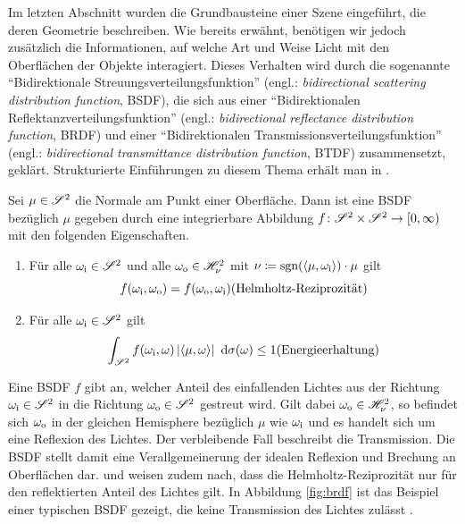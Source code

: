		Im letzten Abschnitt wurden die Grundbausteine einer Szene eingeführt, die deren Geometrie beschreiben.
		Wie bereits erwähnt, benötigen wir jedoch zusätzlich die Informationen, auf welche Art und Weise Licht mit den Oberflächen der Objekte interagiert.
		Dieses Verhalten wird durch die sogenannte \enquote{Bidirektionale Streuungsverteilungsfunktion} (engl.: \textit{bidirectional scattering distribution function}, BSDF), die sich aus einer \enquote{Bidirektionalen Reflektanzverteilungsfunktion} (engl.: \textit{bidirectional reflectance distribution function}, BRDF) und einer \enquote{Bidirektionalen Transmissionsverteilungsfunktion} (engl.: \textit{bidirectional transmittance distribution function}, BTDF) zusammensetzt, geklärt.
		Strukturierte Einführungen zu diesem Thema erhält man in \cite{pbrt3,veach-thesis,real-time-render,intro-brdf,radiosity}.
		\begin{definition}
			Sei $\mu\in\mathscr{S}^{2}$ die Normale am Punkt einer Oberfläche.
			Dann ist eine BSDF bezüglich $\mu$ gegeben durch eine integrierbare Abbildung $f\colon\mathscr{S}^{2}\times\mathscr{S}^{2}\to[0,\infty)$ mit den folgenden Eigenschaften.

			\begin{enumerate}[label = \normalfont{(\roman*)}]
				\item
				Für alle $\omega_{\mathrm{i}}\in\mathscr{S}^{2}$ und alle $\omega_{\mathrm{o}}\in\mathscr{H}^{2}_{\nu}$ mit $\nu\coloneqq\operatorname{sgn}(\left\langle \mu,\omega_{\mathrm{i}} \right\rangle)\cdot\mu$ gilt
				\[
					f(\omega_\m{i},\omega_\m{o}) = f(\omega_\m{o},\omega_\m{i}) \hfill \text{(Helmholtz-Reziprozität)}
				\]

				\item
				Für alle $\omega_{\mathrm{i}}\in\mathscr{S}^{2}$ gilt
				\[
					\integral{\ssp}{}{f(\omega_\m{i},\omega) \abs{\dotp{\mu}{\omega}}}{\sigma(\omega)} \leq 1 \hfill \text{(Energieerhaltung)}
				\]
			\end{enumerate}
		\end{definition}

		Eine BSDF $f$ gibt an, welcher Anteil des einfallenden Lichtes aus der Richtung $\omega_{\mathrm{i}}\in\mathscr{S}^{2}$ in die Richtung $\omega_{\mathrm{o}}\in\mathscr{S}^{2}$ gestreut wird.
		Gilt dabei $\omega_{\mathrm{o}}\in\mathscr{H}^{2}_{\nu}$, so befindet sich $\omega_{\mathrm{o}}$ in der gleichen Hemisphere bezüglich $\mu$ wie $\omega_{\mathrm{i}}$ und es handelt sich um eine Reflexion des Lichtes.
		Der verbleibende Fall beschreibt die Transmission.
		Die BSDF stellt damit eine Verallgemeinerung der idealen Reflexion und Brechung an Oberflächen dar.
		\cite[S.~571~ff]{pbrt3} und \cite[S.~135~ff]{veach-thesis} weisen zudem nach, dass die Helmholtz-Reziprozität nur für den reflektierten Anteil des Lichtes gilt.
		In Abbildung \ref{fig:brdf} ist das Beispiel einer typischen BSDF gezeigt, die keine Transmission des Lichtes zulässt \cite[S.~509~ff]{pbrt3}.


